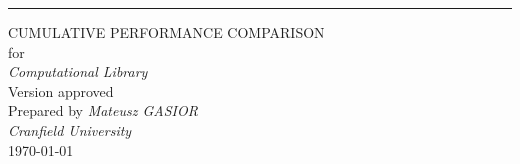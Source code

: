 \begin{flushright}
    \rule{16cm}{5pt}\vskip1cm
    \begin{bfseries}
        \Huge{CUMULATIVE PERFORMANCE COMPARISON}\\
        \vspace{1.9cm}
        for\\
        \vspace{1.9cm}
	    \textit{Computational Library}\\
        \vspace{1.9cm}
        \LARGE{Version \myversion approved}\\
        \vspace{1.9cm}
        Prepared by \textit{Mateusz GASIOR}\\
        \vspace{1.9cm}
        \textit{Cranfield University}\\
        \vspace{1.0cm}
        \today\\
    \end{bfseries}
\end{flushright}